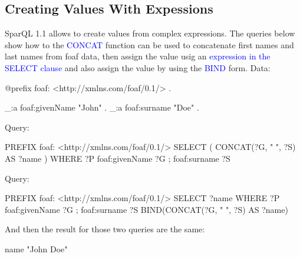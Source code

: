 \subsection{Creating Values With Expessions}
SparQL 1.1 allows to create values from complex expressions. The queries below show how to the \textcolor{blue}{CONCAT} function can be used to concatenate first names and last names from foaf data, then assign the value usig an \textcolor{blue}{expression in the SELECT clause} and also assign the value by using the \textcolor{blue}{BIND} form.
Data:
\begin{fullgreenverb}
@prefix foaf:  <http://xmlns.com/foaf/0.1/> .
      
_:a  foaf:givenName   "John" .
_:a  foaf:surname  "Doe" .
\end{fullgreenverb}

Query:
\begin{fullblueverb}
PREFIX foaf:   <http://xmlns.com/foaf/0.1/>
SELECT ( CONCAT(?G, " ", ?S) AS ?name )
WHERE  { ?P foaf:givenName ?G ; foaf:surname ?S }
\end{fullblueverb}

Query:
\begin{fullblueverb}
PREFIX foaf:   <http://xmlns.com/foaf/0.1/>
SELECT ?name
WHERE  { 
  ?P foaf:givenName ?G ; 
     foaf:surname ?S 
BIND(CONCAT(?G, " ", ?S) AS ?name)
}
\end{fullblueverb}
And then the result for those two queries are the same:
\begin{fullgrayverb}
name
"John Doe"
\end{fullgrayverb}

